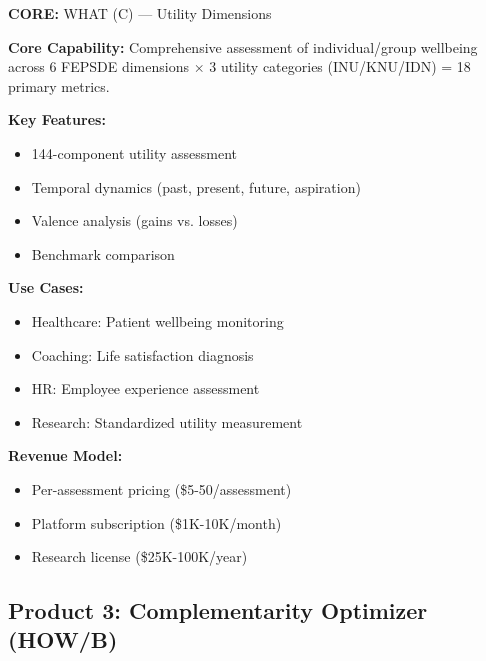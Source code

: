 \begin{tcolorbox}[colback=orange!5!white, colframe=orange!75!black,
    title=Product: FEPSDE Diagnostic Suite]

\textbf{CORE:} WHAT (C) --- Utility Dimensions

\textbf{Core Capability:}
Comprehensive assessment of individual/group wellbeing across 6 FEPSDE dimensions $\times$ 3 utility categories (INU/KNU/IDN) = 18 primary metrics.

\textbf{Key Features:}
\begin{itemize}[nosep]
\item 144-component utility assessment
\item Temporal dynamics (past, present, future, aspiration)
\item Valence analysis (gains vs. losses)
\item Benchmark comparison
\end{itemize}

\textbf{Use Cases:}
\begin{itemize}[nosep]
\item Healthcare: Patient wellbeing monitoring
\item Coaching: Life satisfaction diagnosis
\item HR: Employee experience assessment
\item Research: Standardized utility measurement
\end{itemize}

\textbf{Revenue Model:}
\begin{itemize}[nosep]
\item Per-assessment pricing (\$5-50/assessment)
\item Platform subscription (\$1K-10K/month)
\item Research license (\$25K-100K/year)
\end{itemize}

\end{tcolorbox}


\subsection{Product 3: Complementarity Optimizer (HOW/B)}

